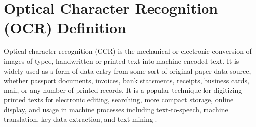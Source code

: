 \section{Optical Character Recognition (OCR) Definition}
Optical character recognition (OCR) is the mechanical or electronic conversion of images of typed, handwritten or printed text into machine-encoded text.
It is widely used as a form of data entry from some sort of original paper data source, whether passport documents, invoices, bank statements, receipts, business cards, mail, or any number of printed records.  It is a popular technique for digitizing printed texts for electronic editing, searching, more compact storage, online display, and usage in machine processes including text-to-speech, machine translation, key data extraction, and text mining \cite{eikvil1993optical}. %




